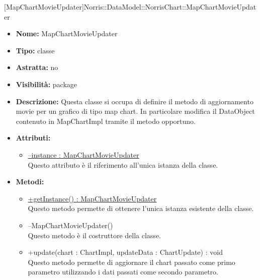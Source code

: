 			
			[MapChartMovieUpdater]{Norris::DataModel::NorrisChart::MapChartMovieUpdater}
			

	
			
			\begin{itemize}
			\item \textbf{Nome:} MapChartMovieUpdater
			\item \textbf{Tipo:} classe
			
		\item \textbf{Astratta:}
		no
			\item \textbf{Visibilità:} package
			\item \textbf{Descrizione:} Questa classe si occupa di definire il metodo di aggiornamento movie per un grafico di tipo map chart. In particolare modifica il DataObject contenuto in MapChartImpl tramite il metodo opportuno.
			\item \textbf{Attributi:}
				\begin{itemize}
				\setlength{\itemsep}{5pt}
				
					\item[\ding{111}] \underline{--instance : MapChartMovieUpdater} \\ [1mm] Questo attributo è il riferimento all'unica istanza della classe.
				\end{itemize}
		
			\item \textbf{Metodi:}
				\begin{itemize}
				\setlength{\itemsep}{5pt}
				
					\item[\ding{111}] {\underline{+getInstance() : MapChartMovieUpdater}} \\ [1mm] Questo metodo permette di ottenere l'unica istanza esistente della classe.
					\item[\ding{111}] {{--MapChartMovieUpdater()}} \\ [1mm] Questo metodo è il costruttore della classe.
					\item[\ding{111}] {{+update(chart : ChartImpl, updateData : ChartUpdate) : void}} \\ [1mm] Questo metodo permette di aggiornare il chart passato come primo parametro utilizzando i dati passati come secondo parametro.
				\end{itemize}
		
			\end{itemize}

